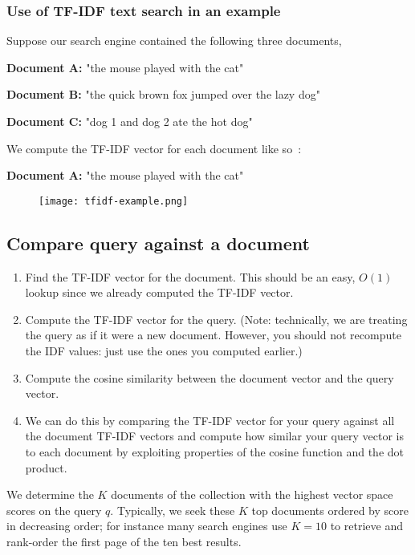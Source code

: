 \subsubsection{Use of TF-IDF text search in an example}

Suppose our search engine contained the following three documents,

\textbf{Document A:} "the mouse played with the cat"

\textbf{Document B:} "the quick brown fox jumped over the lazy dog"

\textbf{Document C:} "dog 1 and dog 2 ate the hot dog"

We compute the TF-IDF vector for each document like so~\cite{tfidfExample}:

\textbf{Document A:} "the mouse played with the cat"
\begin{figure}[h!]
    \texttt{[image: tfidf-example.png]}
\end{figure}

\subsection{Compare query against a document}
\begin{enumerate}
    \item Find the TF-IDF vector for the document. This should be an easy, $O(1)$ lookup since we already computed the TF-IDF vector.
    \item Compute the TF-IDF vector for the query. (Note: technically, we are treating the query as if it were a new document. However, you should not recompute the IDF values: just use the ones you computed earlier.)
    \item Compute the cosine similarity between the document vector and the query vector.
    \item We can do this by comparing the TF-IDF vector for your query against all the document TF-IDF vectors and compute how similar your query vector is to each document by exploiting properties of the cosine function and the dot product.
\end{enumerate}

We determine the $K$ documents of the collection with the highest vector space 
scores on the query $q$. Typically, we seek these $K$ top documents ordered by 
score in decreasing order; for instance many search engines use $K = 10$ to retrieve 
and rank-order the first page of the ten best results.~\cite{tfidfExample}

